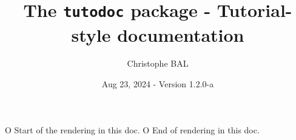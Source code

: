 \newcommand\thispack{\tdocpack{tutodoc}}

\usepackage[lang = english]{tutodoc}


%


%









                       { O{ Start of the rendering in this doc. }
                         O{ End of rendering in this doc. } }{
        \nopagebreak\smallskip\nopagebreak
}{
        \nopagebreak\smallskip\nopagebreak
}





\title{The \texttt{tutodoc} package - Tutorial-style documentation}
\author{Christophe BAL}
\date{Aug 23, 2024 - Version 1.2.0-a}

\maketitle

